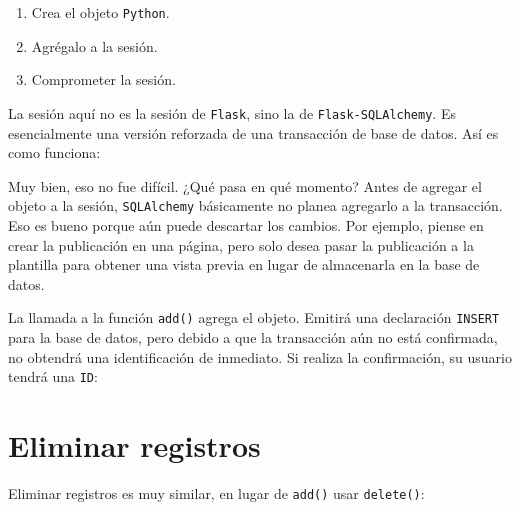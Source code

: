 \documentclass[11pt,letterpaper,notumble]{leaflet}
\begin{document}
    \begin{enumerate}
    	\item Crea el objeto \texttt{Python}.
    	
    	\item Agrégalo a la sesión.
    	
    	\item Comprometer la sesión.
    \end{enumerate}
    
    La sesión aquí no es la sesión de \texttt{Flask}, sino la de \texttt{Flask-SQLAlchemy}. Es esencialmente una versión reforzada de una transacción de base de datos. Así es como funciona:
    
    
	
	\thispagestyle{empty}
	
	\clearpage
			
	    Muy bien, eso no fue difícil. ¿Qué pasa en qué momento? Antes de agregar el objeto a la sesión, \texttt{SQLAlchemy} básicamente no planea agregarlo a la transacción. Eso es bueno porque aún puede descartar los cambios. Por ejemplo, piense en crear la publicación en una página, pero solo desea pasar la publicación a la plantilla para obtener una vista previa en lugar de almacenarla en la base de datos.
			
	    La llamada a la función \texttt{add()} agrega el objeto. Emitirá una declaración \texttt{INSERT} para la base de datos, pero debido a que la transacción aún no está confirmada, no obtendrá una identificación de inmediato. Si realiza la confirmación, su usuario tendrá una \texttt{ID}:
			
	    
			
	    \vspace*{-0.4cm}
		
		\section{Eliminar registros}
		    
		Eliminar registros es muy similar, en lugar de \texttt{add()} usar \texttt{delete()}:
		    
\end{document}
